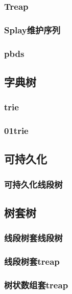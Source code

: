 ﻿\documentclass[a4paper,twocolumn]{article}
\begin{document}
\subsubsection{Treap}

\subsubsection{Splay维护序列}

\subsubsection{pbds}

\subsection{字典树}
\subsubsection{trie}

\subsubsection{01trie}

\subsection{可持久化}
\subsubsection{可持久化线段树}

\subsection{树套树}
\subsubsection{线段树套线段树}

\subsubsection{线段树套treap}

\subsubsection{树状数组套treap}

\end{document}
